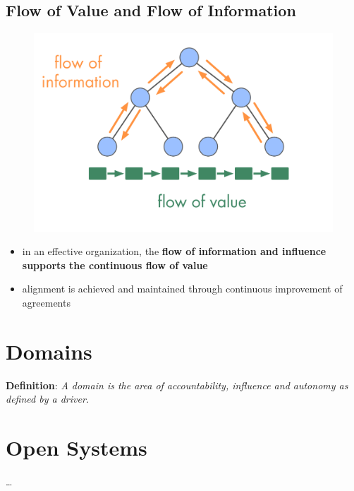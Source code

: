 \subsection{Flow of Value and Flow of Information}
\label{flowofvalueandflowofinformation}

\begin{figure}[htbp]
\centering
\includegraphics[keepaspectratio,width=\textwidth,height=0.75\textheight]{img/evolution/types-of-flow.png}
\end{figure}

\begin{itemize}
\item in an effective organization, the \textbf{flow of information and influence supports the continuous flow of value}

\item alignment is achieved and maintained through continuous improvement of agreements

\end{itemize}

\section{Domains}
\label{domains}

\textbf{Definition}: \emph{A domain is the area of accountability, influence and autonomy as defined by a driver.}

\section{Open Systems}
\label{opensystems}

{\ldots}

